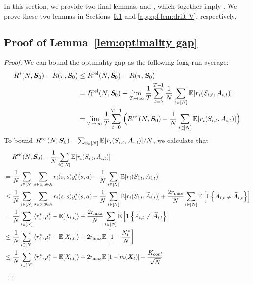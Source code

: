 In this section, we provide two final lemmas,  and , which together imply . We prove these two lemmas in Sections~\ref{app:pf-lem-opt-gap} and \ref{app:pf-lem:drift-V}, respectively. 

\subsection{Proof of Lemma~\ref{lem:optimality gap}}
\label{app:pf-lem-opt-gap}

\optgapbyV*

\begin{proof}
    We can bound the optimality gap as the following long-run average: 
    \begin{align}
        \nonumber
        R^*(N,\bm{S}_0) - R(\pi,\bm{S}_0) 
        &\leq R^{\textup{rel}}(N,\bm{S}_0)-R(\pi,\bm{S}_0)\\
        \nonumber
        &= R^{\textup{rel}}(N,\bm{S}_0) - \lim_{T\to\infty} \frac{1}{T} \sum_{t=0}^{T-1} \frac{1}{N}\sum_{i\in[N]} \mathbb{E}[r_i(S_{i,t},A_{i,t})]  \\
        \nonumber
        &= \lim_{T\to\infty} \frac{1}{T} \sum_{t=0}^{T-1} \Big(R^{\textup{rel}}(N,\bm{S}_0) - \frac{1}{N}\sum_{i\in[N]} \mathbb{E}[r_i(S_{i,t},A_{i,t})]\Big)
    \end{align}
    To bound $R^{\textup{rel}}(N,\bm{S}_0) - \sum_{i\in[N]} \mathbb{E}[r_i(S_{i,t},A_{i,t})] / N$, we calculate that
    \begin{align}
        \nonumber
        &\mspace{23mu} R^{\rel}(N,\bm{S}_0) - \frac{1}{N}\sumN \EE[r_i(S_{i,t},A_{i,t})]  \\
        \nonumber
        &= \frac{1}{N}\sumN\sum_{s\in\sspa,a\in\aspa}r_i(s,a)y_i^*(s,a) - \frac{1}{N}\sumN \EE[r_i(S_{i,t}, A_{i,t})] \\
        \nonumber
        &\leq \frac{1}{N}\sumN\sum_{s\in\sspa,a\in\aspa}r_i(s,a)y_i^*(s,a) - \frac{1}{N}\sumN \EE[r_i(S_{i,t},\widehat{A}_{i,t})] + \frac{2r_{\max}}{N}\sumN\EE\mbracket{\mathbf{1}\sets{A_{i,t}\neq\widehat{A}_{i,t}}}\\
        \nonumber
        &= \frac{1}{N}\sumN\innerproduct{r_i^*}{\mu^*_i-\EE[X_{i,t}]}  + \frac{2r_{\max}}{N}\sumN\EE\mbracket{\mathbf{1}\sets{A_{i,t}\neq\widehat{A}_{i,t}}} \\
        \label{eq:pf-opt-gap-bd:eq-0}
        &\leq \frac{1}{N}\sumN\innerproduct{r_i^*}{\mu^*_i-\EE[X_{i,t}]} + 2r_{\max} \EE\mbracket{1-\frac{N_{t}^*}{N}}\\
        \label{eq:pf-opt-gap-bd:eq-1}
        &\leq
        \frac{1}{N}\sumN\innerproduct{r_i^*}{\mu^*_i-\EE[X_{i,t}]} + 2r_{\max} \EE\mbracket{1-m(\mX_{t})} + \frac{K_{\conf}}{\sqrt{N}} \\

\end{align}
\end{proof}
